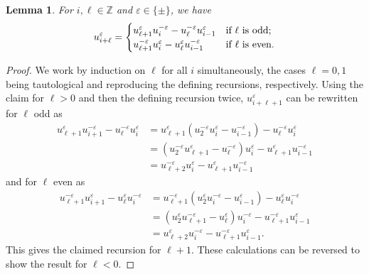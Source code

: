 \documentclass[pdflatex,sn-mathphys]{sn-jnl}%
\theoremstyle{thmstyleone}%
\newtheorem{lemma}[theorem]{Lemma}
\theoremstyle{thmstyletwo}%
\theoremstyle{thmstylethree}%
\newcommand{\ZZ}{\mathbb{Z}}
\begin{document}
  \begin{lemma}
    For $i,\ell\in\ZZ$ and $\varepsilon\in\{\pm\}$, we have
    \begin{equation}
      \label{eq:long Chebyshev recursion}
      u_{i+\ell}^\varepsilon=\begin{cases} u_{\ell+1}^\varepsilon u_i^{-\varepsilon}-u_\ell^{-\varepsilon} u_{i-1}^\varepsilon & \text{\upshape if $\ell$ is odd;}\\ u_{\ell+1}^{-\varepsilon} u_i^\varepsilon-u_\ell^\varepsilon u_{i-1}^{-\varepsilon} & \text{\upshape if $\ell$ is even.} \end{cases}
    \end{equation}
  \end{lemma}
  \begin{proof}
    We work by induction on $\ell$ for all $i$ simultaneously, the cases $\ell=0,1$ being tautological and reproducing the defining recursions, respectively.
    Using the claim for $\ell>0$ and then the defining recursion twice, $u_{i+\ell+1}^\varepsilon$ can be rewritten for $\ell$ odd as
    \begin{align*}
      u_{\ell+1}^\varepsilon u_{i+1}^{-\varepsilon}-u_\ell^{-\varepsilon} u_i^\varepsilon
      &=u_{\ell+1}^\varepsilon(u_2^{-\varepsilon}u_i^\varepsilon-u_{i-1}^{-\varepsilon}) -u_\ell^{-\varepsilon} u_i^\varepsilon\\
      &=(u_2^{-\varepsilon} u_{\ell+1}^\varepsilon-u_\ell^{-\varepsilon}) u_i^\varepsilon-u_{\ell+1}^\varepsilon u_{i-1}^{-\varepsilon}\\
      &=u_{\ell+2}^{-\varepsilon} u_i^\varepsilon - u_{\ell+1}^\varepsilon u_{i-1}^{-\varepsilon}
    \end{align*}
    and for $\ell$ even as
    \begin{align*}
      u_{\ell+1}^{-\varepsilon} u_{i+1}^\varepsilon-u_\ell^\varepsilon u_i^{-\varepsilon}
      &=u_{\ell+1}^{-\varepsilon}(u_2^\varepsilon u_i^{-\varepsilon}-u_{i-1}^\varepsilon) -u_\ell^\varepsilon u_i^{-\varepsilon}\\
      &=(u_2^\varepsilon u_{\ell+1}^{-\varepsilon}-u_\ell^\varepsilon) u_i^{-\varepsilon}-u_{\ell+1}^{-\varepsilon} u_{i-1}^\varepsilon\\
      &=u_{\ell+2}^\varepsilon u_i^{-\varepsilon}-u_{\ell+1}^{-\varepsilon} u_{i-1}^\varepsilon.
    \end{align*}
    This gives the claimed recursion for $\ell+1$.
    These calculations can be reversed to show the result for $\ell<0$.
  \end{proof}
\end{document}
